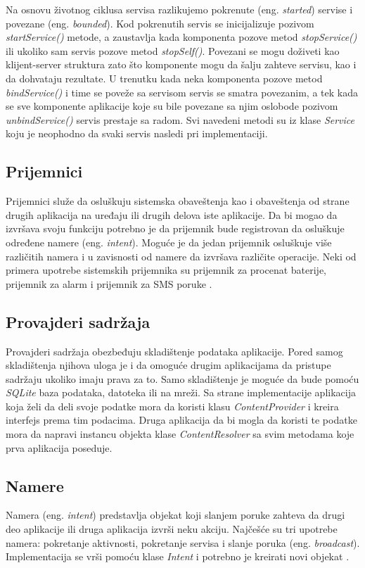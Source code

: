 \documentclass[android.tex]{subfiles}
\begin{document}
Na osnovu životnog ciklusa servisa razlikujemo pokrenute (eng. \textit{started}) servise i povezane (eng. \textit{bounded}). Kod pokrenutih servis se inicijalizuje pozivom \textit{startService()} metode, a zaustavlja kada komponenta pozove metod \textit{stopService() }ili ukoliko sam servis pozove metod \textit{stopSelf()}. Povezani se mogu doživeti kao klijent-server struktura zato što komponente mogu da šalju zahteve servisu, kao i da dohvataju rezultate. U trenutku kada neka komponenta pozove metod \textit{bindService()} i time se poveže sa servisom servis se smatra povezanim, a tek kada se sve komponente aplikacije koje su bile povezane sa njim oslobode pozivom \textit{unbindService()} servis prestaje sa radom. Svi navedeni metodi su iz klase \textit{Service} koju je neophodno da svaki servis nasledi pri implementaciji.


\subsection{Prijemnici}
Prijemnici služe da osluškuju sistemska obaveštenja kao i obaveštenja od strane drugih aplikacija na uređaju ili drugih delova iste aplikacije. Da bi mogao da izvršava svoju funkciju potrebno je da prijemnik bude registrovan da osluškuje određene namere (eng. \textit{intent}). Moguće je da jedan prijemnik osluškuje više različitih namera i u zavisnosti od namere da izvršava različite operacije. Neki od primera upotrebe sistemskih prijemnika su prijemnik za procenat baterije, prijemnik za alarm i prijemnik za SMS poruke \cite{book:mzivkovic}. 

\subsection{Provajderi sadržaja}
Provajderi sadržaja obezbeđuju skladištenje podataka aplikacije. Pored samog skladištenja njihova uloga je i da omoguće drugim aplikacijama da pristupe sadržaju ukoliko imaju prava za to. Samo skladištenje je moguće da bude pomoću \textit{SQLite} baza podataka, datoteka ili na mreži. Sa strane implementacije aplikacija koja želi da deli svoje podatke mora da koristi klasu \textit{ContentProvider} i kreira interfejs prema tim podacima. Druga aplikacija da bi mogla da  koristi te podatke mora da napravi instancu objekta klase \textit{ContentResolver} sa svim metodama koje prva aplikacija poseduje. 

\subsection{Namere}
\label{sec:namere}
Namera (eng. \textit{intent}) predstavlja objekat koji slanjem poruke zahteva da drugi deo aplikacije ili druga aplikacija izvrši neku akciju. Najčešće su tri upotrebe namera: pokretanje aktivnosti, pokretanje servisa i slanje poruka (eng. \textit{broadcast}). Implementacija se vrši pomoću klase \textit{Intent} i potrebno je kreirati novi objekat \cite{sajt:androidDevelopers}. 
\end{document}
